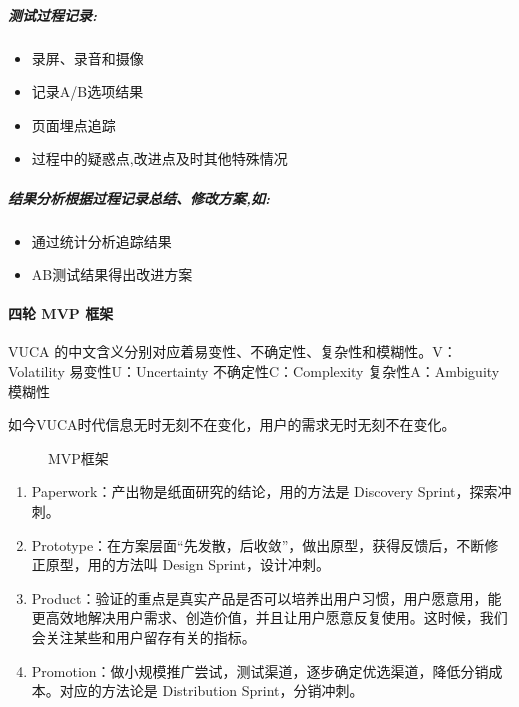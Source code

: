 \documentclass[letterpaper,11pt,english]{sphinxmanual}
\begin{document}
\subparagraph{测试过程记录:}
\label{\detokenize{chapter_knowledge/BRD:id14}}\begin{itemize}
\item {} 
录屏、录音和摄像

\item {} 
记录A/B选项结果

\item {} 
页面埋点追踪

\item {} 
过程中的疑惑点,改进点及时其他特殊情况

\end{itemize}


\subparagraph{结果分析根据过程记录总结、修改方案,如:}
\label{\detokenize{chapter_knowledge/BRD:id15}}\begin{itemize}
\item {} 
通过统计分析追踪结果

\item {} 
AB测试结果得出改进方案

\end{itemize}


\paragraph{四轮 MVP 框架}
\label{\detokenize{chapter_knowledge/BRD:mvp}}
VUCA 的中文含义分别对应着易变性、不确定性、复杂性和模糊性。V：Volatility
易变性U：Uncertainty 不确定性C：Complexity 复杂性A：Ambiguity 模糊性

如今VUCA时代信息无时无刻不在变化，用户的需求无时无刻不在变化。

\begin{figure}[H]
\centering
\capstart

\noindent{}
\caption{MVP框架}\label{\detokenize{chapter_knowledge/BRD:id21}}\end{figure}
\begin{enumerate}
%
\item {} 
Paperwork：产出物是纸面研究的结论，用的方法是 Discovery
Sprint，探索冲刺。

\item {} 
Prototype：在方案层面“先发散，后收敛”，做出原型，获得反馈后，不断修正原型，用的方法叫
Design Sprint，设计冲刺。

\item {} 
Product：验证的重点是真实产品是否可以培养出用户习惯，用户愿意用，能更高效地解决用户需求、创造价值，并且让用户愿意反复使用。这时候，我们会关注某些和用户留存有关的指标。

\item {} 
Promotion：做小规模推广尝试，测试渠道，逐步确定优选渠道，降低分销成本。对应的方法论是
Distribution Sprint，分销冲刺。

\end{enumerate}
\end{document}
